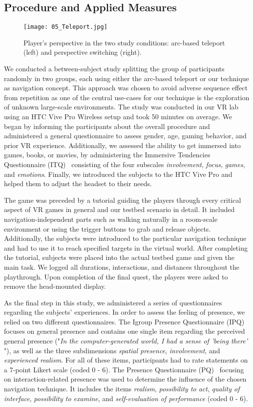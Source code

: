 \documentclass{sigchi}
\begin{document}
\subsection{Procedure and Applied Measures}
\begin{figure}
\centering
\texttt{[image: 05\_Teleport.jpg]}
\caption{Player's perspective in the two study conditions: arc-based teleport (left) and perspective switching (right).}
\label{fig:teleport}
\end{figure}
We conducted a between-subject study splitting the group of participants randomly in two groups, each using either the arc-based teleport or our technique as navigation concept. This approach was chosen to avoid adverse sequence effect from repetition as one of the central use-cases for our technique is the exploration of unknown large-scale environments. The study was conducted in our VR lab using an HTC Vive Pro Wireless setup and took 50 minutes on average. We began by informing the participants about the overall procedure and administered a general questionnaire to assess gender, age, gaming behavior, and prior VR experience. Additionally, we assessed the ability to get immersed into games, books, or movies, by administering the Immersive Tendencies Questionnaire (ITQ)~\cite{Witmer.1998} consisting of the four subscales \textit{involvement}, \textit{focus}, \textit{games}, and \textit{emotions}. Finally, we introduced the subjects to the HTC Vive Pro and helped them to adjust the headset to their needs.\par
The game was preceded by a tutorial guiding the players through every critical aspect of VR games in general and our testbed scenario in detail. It included navigation-independent parts such as walking naturally in a room-scale environment or using the trigger buttons to grab and release objects. Additionally, the subjects were introduced to the particular navigation technique and had to use it to reach specified targets in the virtual world. After completing the tutorial, subjects were placed into the actual testbed game and given the main task. We logged all durations, interactions, and distances throughout the playthrough. Upon completion of the final quest, the players were asked to remove the head-mounted display.\par
As the final step in this study, we administered a series of questionnaires regarding the subjects' experiences. In order to assess the feeling of presence, we relied on two different questionnaires. The Igroup Presence Questionnaire (IPQ)~\cite{Schubert.1999b} focuses on general presence and contains one single item regarding the perceived general presence ("\textit{In the computer-generated world, I had a sense of 'being there'} "), as well as the three subdimensions \textit{spatial presence}, \textit{involvement}, and \textit{experienced realism}. For all of these items, participants had to rate statements on a 7-point Likert scale (coded 0 - 6). The Presence Questionnaire (PQ)~\cite{Witmer.1998,UQO.2004} focusing on interaction-related presence was used to determine the influence of the chosen navigation technique. It includes the items \textit{realism}, \textit{possibility to act}, \textit{quality of interface}, \textit{possibility to examine}, and \textit{self-evaluation of performance} (coded 0 - 6).
\end{document}

